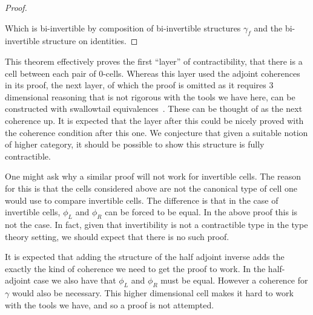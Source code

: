 \documentclass{article}
\begin{document}
\begin{proof}
\begin{center}
  \end{center}

  Which is bi-invertible by composition of bi-invertible structures
  \(\gamma_f\) and the bi-invertible structure on identities.
\end{proof}

This theorem effectively proves the first ``layer'' of
contractibility, that there is a cell between each pair of
\(0\)-cells. Whereas this layer used the adjoint coherences in its
proof, the next layer, of which the proof is omitted as it requires 3
dimensional reasoning that is not rigorous with the tools we have
here, can be constructed with swallowtail
equivalences~\cite{nlab:lax_2-adjunction}. These can be thought of as
the next coherence up. It is expected that the layer after this could
be nicely proved with the coherence condition after this one. We
conjecture that given a suitable notion of higher category, it should
be possible to show this structure is fully contractible.

One might ask why a similar proof will not work for invertible cells.
The reason for this is that the cells considered above are not the
canonical type of cell one would use to compare invertible cells. The
difference is that in the case of invertible cells, \(\phi_L\) and
\(\phi_R\) can be forced to be equal. In the above proof this is not
the case. In fact, given that invertibility is not a contractible type
in the type theory setting, we should expect that there is no such
proof.

It is expected that adding the structure of the half adjoint inverse
adds the exactly the kind of coherence we need to get the proof to
work. In the half-adjoint case we also have that \(\phi_L\) and
\(\phi_R\) must be equal. However a coherence for \(\gamma\) would also be necessary.
This higher dimensional cell makes it hard to work with the tools we
have, and so a proof is not attempted.
\end{document}
